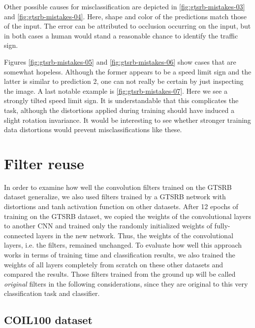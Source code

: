 \documentclass[11pt, a4paper]{article}
\begin{document}
Other possible causes for misclassification are depicted in \ref{fig:gtsrb-mistakes-03} and \ref{fig:gtsrb-mistakes-04}. Here, shape and color of the predictions match those of the input. The error can be attributed to occlusion occurring on the input, but in both cases a human would stand a reasonable chance to identify the traffic sign.

Figures \ref{fig:gtsrb-mistakes-05} and \ref{fig:gtsrb-mistakes-06} show cases that are somewhat hopeless. Although the former appears to be a speed limit sign and the latter is similar to prediction 2, one can not really be certain by just inspecting the image. A last notable example is \ref{fig:gtsrb-mistakes-07}. Here we see a strongly tilted speed limit sign. It is understandable that this complicates the task, although the distortions applied during training should have induced a slight rotation invariance. It would be interesting to see whether stronger training data distortions would prevent misclassifications like these.

\section{Filter reuse}

In order to examine how well the convolution filters trained on the GTSRB dataset generalize, we also used filters trained by a GTSRB network with distortions and tanh activation function on other datasets. After 12 epochs of training on the GTSRB dataset, we copied the weights of the convolutional layers to another CNN and trained only the randomly initialized weights of fully-connected layers in the new network. Thus, the weights of the convolutional layers, i.e. the filters, remained unchanged. To evaluate how well this approach works in terms of training time and classification results, we also trained the weights of all layers completely from scratch on these other datasets and compared the results. Those filters trained from the ground up will be called \textit{original} filters in the following considerations, since they are original to this very classification task and classifier.

\subsection{COIL100 dataset}
\end{document}
